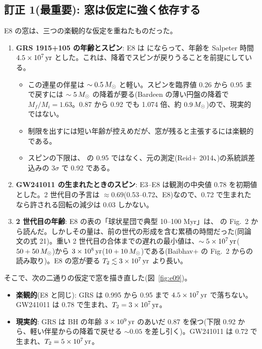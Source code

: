 \subsection{訂正 1(最重要): 窓は仮定に強く依存する}

E8 の窓は、三つの楽観的な仮定を重ねたものだった。
\begin{enumerate}
\item \textbf{GRS 1915+105 の年齢とスピン}: E8 は  にならって、年齢を Salpeter 時間 $4.5\times10^7\,\mathrm{yr}$ とした。これは、降着でスピンが戻りうることを前提にしている。
  \begin{itemize}
  \item この連星の伴星は $\sim0.5\,M_\odot$ と軽い。スピンを臨界値 0.26 から 0.95 まで戻すには $\sim5\,M_\odot$ の降着が要る(Bardeen の薄い円盤の降着で $M_f/M_i=1.63$。0.87 から 0.92 でも 1.074 倍、約 $0.9\,M_\odot$)ので、現実的ではない。
  \item 制限を出すには短い年齢が控えめだが、窓が残ると主張するには楽観的である。
  \item スピンの下限は、 の 0.95 ではなく、元の測定(Reid+ 2014、)の系統誤差込みの 3$\sigma$ で 0.92 である。
  \end{itemize}
\item \textbf{GW241011 の生まれたときのスピン}: E3--E8 は観測の中央値 0.78 を初期値とした。2 世代目の予言は $\approx0.69$(0.53--0.72、E8)なので、0.72 で生まれたなら許される回転の減少は 0.03 しかない。
\item \textbf{2 世代目の年齢}: E8 の表の「球状星団で典型 10--100 Myr」は、 の Fig.~2 から読んだ。しかしその量は、前の世代の形成を含む累積の時間だった(同論文の式 21)。重い 2 世代目の合体までの遅れの最小値は、$\sim5\times10^7\,\mathrm{yr}$($50+50\,M_\odot$)から $3\times10^8\,\mathrm{yr}$($10+10\,M_\odot$)である(Baibhav+  の Fig.~2 からの読み取り)。E8 の窓が要る $T_2\lesssim3\times10^7\,\mathrm{yr}$ より長い。
\end{enumerate}

そこで、次の二通りの仮定で窓を描き直した(図~\ref{fig:e09})。
\begin{itemize}
\item \textbf{楽観的}(E8 と同じ): GRS は 0.995 から 0.95 まで $4.5\times10^7\,\mathrm{yr}$ で落ちない。GW241011 は 0.78 で生まれ、$T_2=3\times10^7\,\mathrm{yr}$。
\item \textbf{現実的}: GRS は BH の年齢 $3\times10^9\,\mathrm{yr}$ のあいだ 0.87 を保つ(下限 0.92 から、軽い伴星からの降着で戻せる $\sim0.05$ を差し引く)。GW241011 は 0.72 で生まれ、$T_2=5\times10^7\,\mathrm{yr}$。
\end{itemize}

